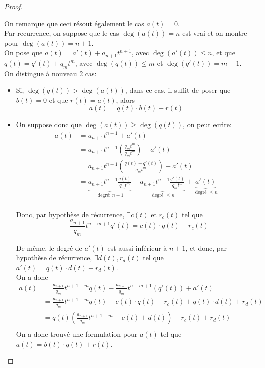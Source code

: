 \documentclass[11pt, a4paper, twoside]{article}
\begin{document}
\begin{proof}
\begin{itemize}
\end{itemize}
On remarque que ceci résout également le cas $ a(t)=0$.\\
Par recurrence, on suppose que le cas $\deg(a(t))=n$ est vrai et on montre pour $\deg(a(t))=n+1$.\\
On pose que $a(t)=a'(t) + a_{n+1} t^{n+1}$, avec $\deg(a'(t))\leq n$, et que $q(t) = q'(t) + q_m t^{m}$, avec $\deg(q(t)) \leq m$ et $\deg(q'(t))= m-1$.\\
On distingue à nouveau 2 cas:
\begin{itemize}
	\item Si, $\deg(q(t)) > \deg(a(t))$, dans ce cas, il suffit de poser que $b(t) = 0$ et que $r(t)= a(t)$, alors
		\[ 
			a(t) = q(t) \cdot b(t) + r(t)
		\]
	\item On suppose donc que $\deg(a(t)) \geq \deg(q(t))$, on peut ecrire:
		\begin{align*}
			a(t) &= a_{n+1} t^{n+1} + a'(t)\\
			     &= a_{n+1} t^{n+1} \left( \frac{q_m t^{m}}{q_{m} t^{m}}\right) + a'(t)\\
			     &= a_{n+1} t^{n+1} \left( \frac{q(t) - q'(t)}{q_{m} t^{m}}\right) + a'(t)\\
			     &= \underbrace{a_{n+1} t^{n+1} \frac{q(t)}{q_m t^{m}}}_{ \text{ degré: } n+1}
			     - \underbrace{a_{n+1} t^{n+1} \frac{q'(t)}{q_m t^{m}}}_{ \text{ degré  } \leq n } + \underbrace{a'(t)}_{ \text{ degré } \leq n}\\
		\end{align*}
		
Donc, par hypothèse de récurrence, $\exists c(t)$ et $r_c(t)$ tel que
\[ 
	-\frac{a_{n+1}}{q_m} t^{n-m+1} q'(t) = c(t) \cdot q(t) + r_c(t)
\]

De même, le degré de $a'(t)$ est aussi inférieur à $n+1$, et donc, par hypothèse de récurrence, $\exists d(t) , r_d(t)$ tel que $a'(t)= q(t)\cdot d(t) + r_d(t)$.\\
On a donc
\begin{align*}
	a(t) &= \frac{a_{n+1}}{q_m} t^{n+1-m} q(t) - \frac{a_{n+1}}{q_m} t^{n-m+1} ( q'(t)) + a'(t)\\
	     &= \frac{a_{n+1}}{q_m} t^{n+1-m} q(t) - c(t) \cdot q(t) - r_c(t) + q(t) \cdot d(t) + r_d(t)\\
	     &= q(t) \left( \frac{a_{n+1}}{q_m} t^{n+1-m} - c(t) + d(t) \right) - r_c(t) + r_d(t) \\
\end{align*}
On a donc trouvé une formulation pour $a(t)$ tel que $a(t)=b(t) \cdot q(t) + r(t)$.
\end{itemize}
\end{proof}
\end{document}
